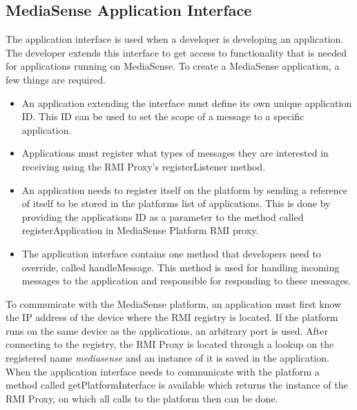 \subsection{MediaSense Application Interface}
The application interface is used when a developer is developing an application. The developer extends this interface to get access to functionality that is needed for applications running on MediaSense. 
To create a MediaSense application, a few things are required. 

\begin{itemize}
  \item An application extending the interface must define its own unique application ID. This ID can be used to set the scope of a message to a specific application. 
  \item Applications must register what types of messages they are interested in receiving using the RMI Proxy's registerListener method. 
  \item An application needs to register itself on the platform by sending a reference of itself to be stored in the platforms list of applications. This is done by providing the applications ID as a parameter to the method called registerApplication in MediaSense Platform RMI proxy.
  \item The application interface contains one method that developers need to override, called handleMessage. This method is used for handling incoming messages to the application and responsible for responding to these messages. 
\end{itemize}

To communicate with the MediaSense platform, an application must first know the IP address of the device where the RMI registry is located. If the platform runs on the same device as the applications, an arbitrary port is used. After connecting to the registry, the RMI Proxy is located through a lookup on the registered name \emph{mediasense} and an instance of it is saved in the application. When the application interface needs to communicate with the platform a method called getPlatformInterface is available which returns the instance of the RMI Proxy, on which all calls to the platform then can be done.

